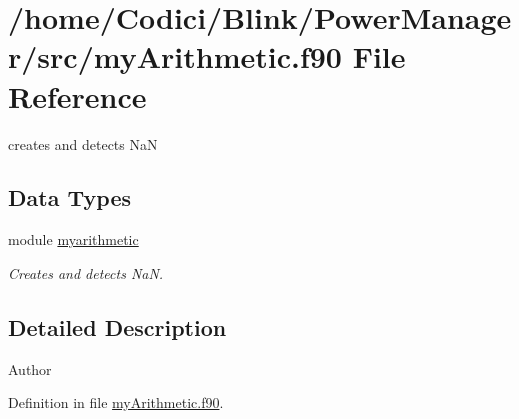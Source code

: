 \hypertarget{my_arithmetic_8f90}{\section{/home/\-Codici/\-Blink/\-Power\-Manager/src/my\-Arithmetic.f90 File Reference}
\label{my_arithmetic_8f90}
}


creates and detects Na\-N  


\subsection*{Data Types}
\begin{DoxyCompactItemize}
\item 
module \hyperlink{classmyarithmetic}{myarithmetic}
\begin{DoxyCompactList}\small\item\em Creates and detects Na\-N. \end{DoxyCompactList}\end{DoxyCompactItemize}


\subsection{Detailed Description}
\begin{DoxyAuthor}{Author}

\end{DoxyAuthor}


Definition in file \hyperlink{my_arithmetic_8f90_source}{my\-Arithmetic.\-f90}.

